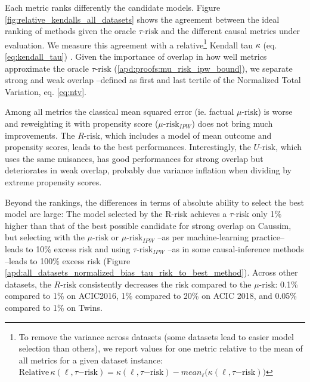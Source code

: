\documentclass[10pt]{article}
\begin{document}
\begin{multicols}{2}
    Each metric ranks differently the candidate models. Figure
    \ref{fig:relative_kendalls_all_datasets} shows the agreement between the
    ideal ranking of methods given the oracle $\tau\text{-risk}$ and
    the different causal metrics under evaluation. We measure this agreement
    with a relative\footnote{To remove the variance
        across datasets (some datasets lead to easier model selection than
        others), we report values for one metric relative to the mean of all
        metrics for a given dataset instance: $\text{Relative} \, \kappa(\ell,\tau\mathrm{{-risk}})=
            \kappa(\ell,\tau\mathrm{{-risk}}) -
            mean_{\ell}\big(\kappa(\ell,\tau\mathrm{{-risk}})\big)$} Kendall tau $\kappa$ (eq.
    \ref{eq:kendall_tau}) \cite{kendall_new_1938}.
    Given the importance of overlap in
    how well metrics approximate the oracle $\tau\text{-risk}$
    (\autoref{apd:proofs:mu_risk_ipw_bound}), we separate
    strong and weak overlap --defined as first and
    last tertile of the Normalized Total Variation, eq. \ref{eq:ntv}.

    Among all metrics the classical mean squared error (ie. factual
    $\mu\text{-risk}$) is worse and reweighting it with propensity score
    ($\mu\text{-risk}_{IPW}$) does not bring much improvements. The
    $R\text{-risk}$, which includes a model of mean outcome and propensity
    scores, leads to the best performances. Interestingly, the
    $U\text{-risk}$, which uses the same nuisances, has good performances for
    strong overlap but deteriorates in weak overlap, probably due variance
    inflation when dividing by extreme propensity scores.

    Beyond the rankings, the differences in terms of absolute
    ability to select the best model are large: The model selected by the R-risk
    achieves a $\tau\text{-risk}$ only 1\% higher
    than that of the best
    possible candidate for strong overlap on Caussim, but selecting with
    the $\mu\text{-risk}$ or $\mu\text{-risk}_{IPW}$ --as per machine-learning
    practice-- leads to 10\% excess risk and using $\tau\text{-risk}_{IPW}$
    --as in some causal-inference methods \citep{athey2016recursive,gutierrez_causal_2016}--leads to 100\% excess risk
    (Figure
    \ref{apd:all_datasets_normalized_bias_tau_risk_to_best_method}). Across
    other datasets, the $R\text{-risk}$ consistently decreases the
    risk compared to the $\mu\text{-risk}$:
    0.1\% compared to 1\% on ACIC2016,  1\% compared to 20\% on ACIC 2018,
    and 0.05\% compared to 1\% on Twins.



\end{multicols}
\end{document}
